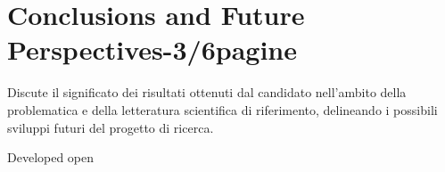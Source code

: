 
\chapter{Conclusions and Future Perspectives-3/6pagine} %

\label{Chapter6} %


 Discute il significato dei risultati ottenuti dal candidato nell’ambito della problematica e della letteratura scientifica di riferimento, delineando i possibili sviluppi futuri del progetto di ricerca.



Developed  open 
 